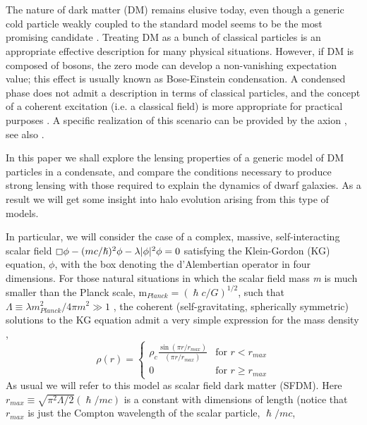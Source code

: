 \documentclass[10pt,twoside,twocolumn]{article}
\begin{document}
    \section{}
The nature of dark matter (DM) remains elusive today,
even though a generic cold particle weakly coupled to the standard model seems to be the most promising candidate \cite{1}. Treating DM as a bunch of classical particles is an appropriate effective description for many physical situations. However, if DM is composed of bosons, the zero mode can develop a non-vanishing expectation value; this effect is usually known as Bose-Einstein condensation. A condensed phase does not admit a description in terms of classical particles, and the concept of a coherent excitation (i.e. a classical field) is more appropriate for practical purposes \cite{2}. A specific realization of this scenario can be provided by the axion \cite{3}, see also \cite{4}.\par
In this paper we shall explore the lensing properties of a generic model of DM particles in a condensate, and compare the conditions necessary to produce strong lensing with those required to explain the dynamics of dwarf galaxies. As a result we will get some insight into halo evolution arising from this type of models.\par
In particular, we will consider the case of a complex, massive, self-interacting scalar field $\boxempty\phi-(mc/\hslash)^2\phi-\lambda|\phi|^2\phi=0$ satisfying the Klein-Gordon (KG) equation, \(\phi\), with the box denoting the d’Alembertian operator in four dimensions. For those natural situations in which the scalar field mass \textit{m} is much smaller than the Planck scale, m$_{Planck}=(\hslash c/G)^{1/2}$, such that
$\Lambda\equiv\lambda m^2_{Planck}/4\pi m^2\gg 1$ , the coherent (self-gravitating, spherically symmetric) solutions to the KG equation admit a very simple expression for the mass density \cite{5,6},
\begin{equation}
\rho(r)= \left\{\begin{array}{rl}  \rho_c\frac{\sin(\pi r/r_{max})}{(\pi r/r_{max})} & \text{for } r < r_{max}\\ 
0 & \text{for } r \geq r_{max} \end{array} \right. 
\label{eq:1}
\end{equation}
As usual we will refer to this model as scalar field dark
matter (SFDM). Here $r_{max}\equiv\sqrt{\pi^2\Lambda/2}(\hslash/mc)$ is a constant with dimensions of length (notice that $r_{max}$ is just the Compton wavelength of the scalar particle, $\hslash/mc$,
\end{document}
